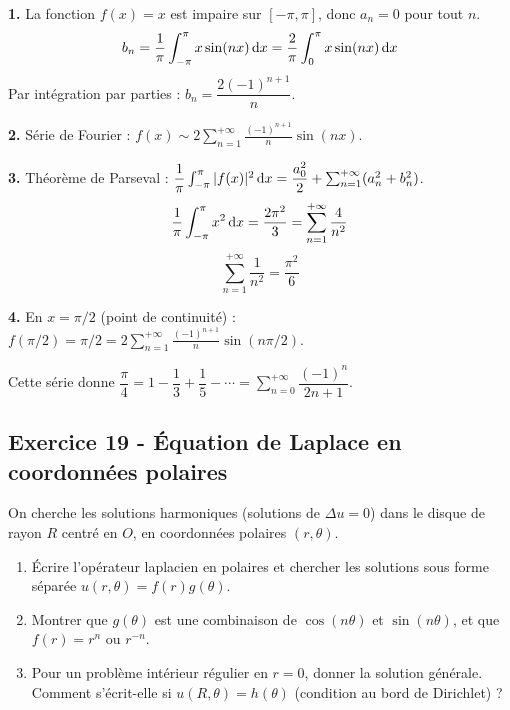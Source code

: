 \documentclass[12pt,a4paper]{article}
\begin{document}
\begin{boitecorrige}
\textbf{1.} La fonction $f(x) = x$ est impaire sur $[-\pi,\pi]$, donc $a_n = 0$ pour tout $n$.
\[
b_n = \frac{1}{\pi}\int_{-\pi}^{\pi} x\sin(nx)\,\mathrm{d} x = \frac{2}{\pi}\int_0^{\pi} x\sin(nx)\,\mathrm{d} x
\]
Par intégration par parties : $b_n = \dfrac{2(-1)^{n+1}}{n}$.

\textbf{2.} Série de Fourier : $f(x) \sim \displaystyle 2\sum_{n=1}^{+\infty} \frac{(-1)^{n+1}}{n}\sin(nx)$.

\textbf{3.} Théorème de Parseval : $\dfrac{1}{\pi}\int_{-\pi}^{\pi}|f(x)|^2\,\mathrm{d} x = \dfrac{a_0^2}{2} + \sum_{n=1}^{+\infty}(a_n^2+b_n^2)$.
\[
\frac{1}{\pi}\int_{-\pi}^{\pi} x^2\,\mathrm{d} x = \frac{2\pi^2}{3} = \sum_{n=1}^{+\infty} \frac{4}{n^2}
\]
\[
\sum_{n=1}^{+\infty} \frac{1}{n^2} = \frac{\pi^2}{6}
\]

\textbf{4.} En $x = \pi/2$ (point de continuité) : $f(\pi/2) = \pi/2 = 2\sum_{n=1}^{+\infty}\frac{(-1)^{n+1}}{n}\sin(n\pi/2)$.

Cette série donne $\dfrac{\pi}{4} = 1 - \dfrac{1}{3} + \dfrac{1}{5} - \cdots = \sum_{n=0}^{+\infty}\dfrac{(-1)^n}{2n+1}$.
\end{boitecorrige}

\subsection*{Exercice 19 - Équation de Laplace en coordonnées polaires \niveau{\moyen}}

\begin{boiteexercice}
On cherche les solutions harmoniques (solutions de $\Delta u = 0$) dans le disque de rayon $R$ centré en $O$, en coordonnées polaires $(r,\theta)$.
\begin{enumerate}
  \item Écrire l'opérateur laplacien en polaires et chercher les solutions sous forme séparée $u(r,\theta) = f(r)g(\theta)$.
  \item Montrer que $g(\theta)$ est une combinaison de $\cos(n\theta)$ et $\sin(n\theta)$, et que $f(r) = r^n$ ou $r^{-n}$.
  \item Pour un problème intérieur régulier en $r=0$, donner la solution générale. Comment s'écrit-elle si $u(R,\theta) = h(\theta)$ (condition au bord de Dirichlet) ?
\end{enumerate}
\end{boiteexercice}
\end{document}
